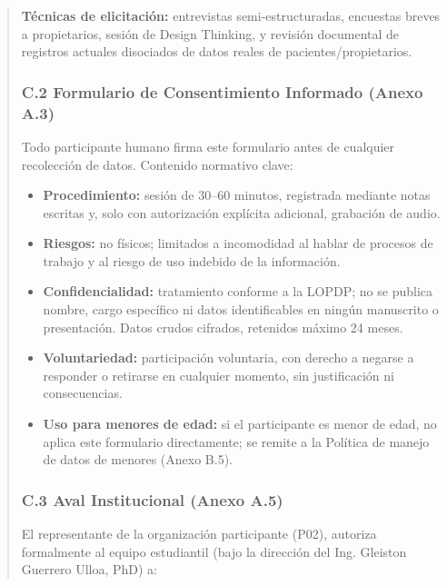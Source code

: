 \documentclass[
]{article}
\begin{document}
\begin{quote}
\textbf{Técnicas de elicitación:} entrevistas semi-estructuradas, encuestas breves a propietarios, sesión de Design Thinking, y revisión documental de registros actuales disociados de datos reales de pacientes/propietarios.

\subsubsection{C.2 Formulario de Consentimiento Informado (Anexo A.3)}\label{c2-consentimiento-informado}

Todo participante humano firma este formulario antes de cualquier recolección de datos. Contenido normativo clave:

\begin{itemize}
  \item \textbf{Procedimiento:} sesión de 30--60 minutos, registrada mediante notas escritas y, solo con autorización explícita adicional, grabación de audio.
  \item \textbf{Riesgos:} no físicos; limitados a incomodidad al hablar de procesos de trabajo y al riesgo de uso indebido de la información.
  \item \textbf{Confidencialidad:} tratamiento conforme a la LOPDP; no se publica nombre, cargo específico ni datos identificables en ningún manuscrito o presentación. Datos crudos cifrados, retenidos máximo 24 meses.
  \item \textbf{Voluntariedad:} participación voluntaria, con derecho a negarse a responder o retirarse en cualquier momento, sin justificación ni consecuencias.
  \item \textbf{Uso para menores de edad:} si el participante es menor de edad, no aplica este formulario directamente; se remite a la Política de manejo de datos de menores (Anexo B.5).
\end{itemize}

\subsubsection{C.3 Aval Institucional (Anexo A.5)}\label{c3-aval-institucional}

El representante de la organización participante (P02), autoriza formalmente al equipo estudiantil (bajo la dirección del Ing. Gleiston Guerrero Ulloa, PhD) a:


\end{quote}
\end{document}
